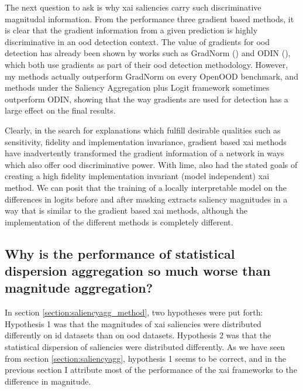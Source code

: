 \documentclass[UKenglish]{uiomasterthesis} %
\theoremstyle{definition}
\begin{document}
The next question to ask is why \ac{xai} saliencies carry such discriminative magnitudal information. From the performance three gradient based methods, it is clear that the gradient information from a given prediction is highly discriminative in an \ac{ood} detection context. The value of gradients for \ac{ood} detection has already been shown by works such as GradNorm (\cite{gradnorm}) and ODIN (\cite{odin}), which both use gradients as part of their \ac{ood} detection methodology. However, my methods actually outperform GradNorm on every OpenOOD benchmark, and methods under the Saliency Aggregation plus Logit framework sometimes outperform ODIN, showing that the way gradients are used for detection has a large effect on the final results.

Clearly, in the search for explanations which fulfill desirable qualities such as sensitivity, fidelity and implementation invariance, gradient based \ac{xai} methods have inadvertently transformed the gradient information of a network in ways which also offer \ac{ood} discriminative power. With \ac{lime}, \cite{lime} also had the stated goals of creating a high fidelity implementation invariant (model independent) \ac{xai} method. We can posit that the training of a locally interpretable model on the differences in logits before and after masking extracts saliency magnitudes in a way that is similar to the gradient based \ac{xai} methods, although the implementation of the different methods is completely different.



\subsection{Why is the performance of statistical dispersion aggregation so much worse than magnitude aggregation?}

In section \ref{section:saliencyagg_method}, two hypotheses were put forth: Hypothesis 1 was that the magnitudes of \ac{xai} saliencies were distributed differently on \ac{id} datasets than on \ac{ood} datasets. Hypothesis 2 was that the statistical dispersion of saliencies were distributed differently. As we have seen from section \ref{section:saliencyagg}, hypothesis 1 seems to be correct, and in the previous section I attribute most of the performance of the \ac{xai} frameworks to the difference in magnitude.
\end{document}
